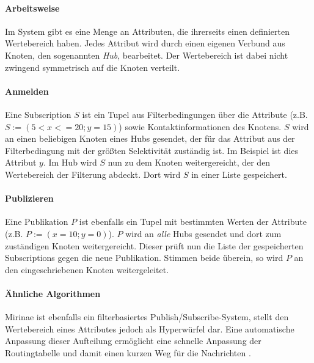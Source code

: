 \paragraph*{Arbeitsweise}
Im System gibt es eine Menge an Attributen, die ihrerseits einen definierten Wertebereich haben. Jedes Attribut wird durch einen eigenen Verbund aus Knoten, den sogenannten \emph{Hub}, bearbeitet. Der Wertebereich ist dabei nicht zwingend symmetrisch auf die Knoten verteilt.

\paragraph*{Anmelden}
Eine Subscription $S$ ist ein Tupel aus Filterbedingungen über die Attribute (z.B. $S := (5 < x <= 20; y = 15)$) sowie Kontaktinformationen des Knotens. $S$ wird an einen beliebigen Knoten eines Hubs gesendet, der für das Attribut aus der Filterbedingung mit der größten Selektivität zuständig ist. Im Beispiel ist dies Attribut $y$. Im Hub wird $S$ nun zu dem Knoten weitergereicht, der den Wertebereich der Filterung abdeckt. Dort wird $S$ in einer Liste gespeichert.

\paragraph*{Publizieren}
Eine Publikation $P$ ist ebenfalls ein Tupel mit bestimmten Werten der Attribute (z.B. $P := (x = 10; y = 0)$). $P$ wird an \emph{alle} Hubs gesendet und dort zum zuständigen Knoten weitergereicht. Dieser prüft nun die Liste der gespeicherten Subscriptions gegen die neue Publikation. Stimmen beide überein, so wird $P$ an den eingeschriebenen Knoten weitergeleitet.


\paragraph*{Ähnliche Algorithmen}
Mirinae ist ebenfalls ein filterbasiertes Publish/Subscribe-System, stellt den Wertebereich eines Attributes jedoch als Hyperwürfel dar. Eine automatische Anpassung dieser Aufteilung ermöglicht eine schnelle Anpassung der Routingtabelle und damit einen kurzen Weg für die Nachrichten \cite{Choi2005Mirinae}.
